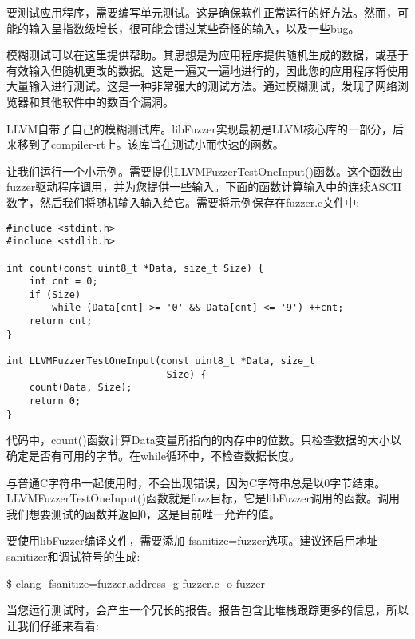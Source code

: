 
要测试应用程序，需要编写单元测试。这是确保软件正常运行的好方法。然而，可能的输入呈指数级增长，很可能会错过某些奇怪的输入，以及一些bug。\par

模糊测试可以在这里提供帮助。其思想是为应用程序提供随机生成的数据，或基于有效输入但随机更改的数据。这是一遍又一遍地进行的，因此您的应用程序将使用大量输入进行测试。这是一种非常强大的测试方法。通过模糊测试，发现了网络浏览器和其他软件中的数百个漏洞。\par

LLVM自带了自己的模糊测试库。libFuzzer实现最初是LLVM核心库的一部分，后来移到了compiler-rt上。该库旨在测试小而快速的函数。\par

让我们运行一个小示例。需要提供LLVMFuzzerTestOneInput()函数。这个函数由fuzzer驱动程序调用，并为您提供一些输入。下面的函数计算输入中的连续ASCII数字，然后我们将随机输入输入给它。需要将示例保存在fuzzer.c文件中:\par

\begin{lstlisting}[caption={}]
#include <stdint.h>
#include <stdlib.h>

int count(const uint8_t *Data, size_t Size) {
	int cnt = 0;
	if (Size)
		while (Data[cnt] >= '0' && Data[cnt] <= '9') ++cnt;
	return cnt;
}

int LLVMFuzzerTestOneInput(const uint8_t *Data, size_t
							Size) {
	count(Data, Size);
	return 0;
}
\end{lstlisting}

代码中，count()函数计算Data变量所指向的内存中的位数。只检查数据的大小以确定是否有可用的字节。在while循环中，不检查数据长度。\par

与普通C字符串一起使用时，不会出现错误，因为C字符串总是以0字节结束。LLVMFuzzerTestOneInput()函数就是fuzz目标，它是libFuzzer调用的函数。调用我们想要测试的函数并返回0，这是目前唯一允许的值。\par

要使用libFuzzer编译文件，需要添加-fsanitize=fuzzer选项。建议还启用地址sanitizer和调试符号的生成:\par

\begin{tcolorbox}[colback=white,colframe=black]
\$ clang -fsanitize=fuzzer,address -g fuzzer.c -o fuzzer
\end{tcolorbox}

当您运行测试时，会产生一个冗长的报告。报告包含比堆栈跟踪更多的信息，所以让我们仔细来看看:\par

